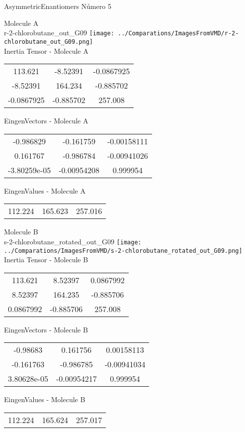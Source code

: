 \vtab[-2cm]
\begin{center}
{\large AsymmetricEnantiomers \tab Número 5}
\end{center}
\begin{multicols}{2}
\begin{center}

Molecule A \\ 
r-2-chlorobutane\_out\_G09
\texttt{[image: ../Comparations/ImagesFromVMD/r-2-chlorobutane\_out\_G09.png]}
\\
Inertia Tensor - Molecule A \\
\vtab

\begin{tabular}{|c c c|}
113.621	 & 	-8.52391	 & 	-0.0867925	 \\
-8.52391	 & 	164.234	 & 	-0.885702	 \\
-0.0867925	 & 	-0.885702	 & 	257.008
\end{tabular}

\vtab
 EingenVectors - Molecule A     \\
\vtab
\begin{tabular}{|c c c|}
-0.986829	 & 	-0.161759	 & 	-0.00158111	 \\
0.161767	 & 	-0.986784	 & 	-0.00941026	 \\
-3.80259e-05	 & 	-0.00954208	 & 	0.999954
\end{tabular}

\vtab
 EingenValues - Molecule A     \\
\vtab
\begin{tabular}{|c c c|}
112.224	 & 	165.623	 & 	257.016	 \\
\end{tabular}
\columnbreak

Molecule B \\ 
s-2-chlorobutane\_rotated\_out\_G09
\texttt{[image: ../Comparations/ImagesFromVMD/s-2-chlorobutane\_rotated\_out\_G09.png]}
\\
Inertia Tensor - Molecule B \\
\vtab

\begin{tabular}{|c c c|}
113.621	 & 	8.52397	 & 	0.0867992	 \\
8.52397	 & 	164.235	 & 	-0.885706	 \\
0.0867992	 & 	-0.885706	 & 	257.008
\end{tabular}

\vtab
 EingenVectors - Molecule B     \\
\vtab
\begin{tabular}{|c c c|}
-0.98683	 & 	0.161756	 & 	0.00158113	 \\
-0.161763	 & 	-0.986785	 & 	-0.00941034	 \\
3.80628e-05	 & 	-0.00954217	 & 	0.999954
\end{tabular}

\vtab
 EingenValues - Molecule B     \\
\vtab
\begin{tabular}{|c c c|}
112.224	 & 	165.624	 & 	257.017	 \\
\end{tabular}

\end{center}
\end{multicols}
